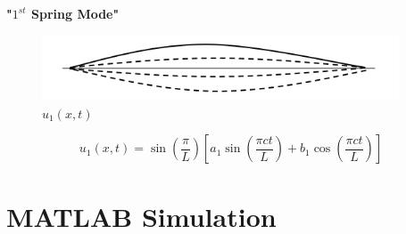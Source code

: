 \documentclass[12pt,a4paper]{article}
\begin{document}
	\begin{center}
	\textbf{"$1^{st}$ Spring Mode"}
	\end{center}

	\begin{figure}[h]
	\begin{center}
		\includegraphics[width=400px]{wave6.PNG}
		$u_1(x,t)$
	\end{center}
	\end{figure}
	
	$$u_1(x,t) = \sin\left(\frac{\pi}{L}\right)\left[a_1 \sin\left(\frac{\pi c t}{L}\right)+b_1\cos \left(\frac {\pi c t}{L}\right)\right]$$
	
	\part{MATLAB Simulation}
\end{document}
